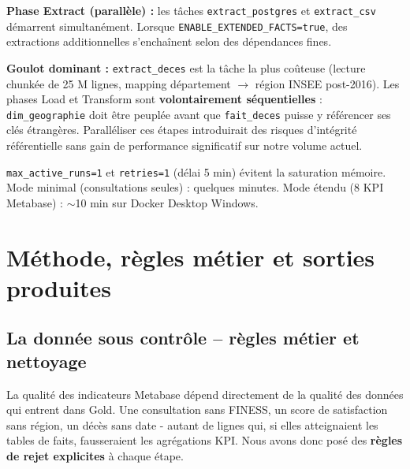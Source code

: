 \documentclass[12pt,a4paper]{report}
\begin{document}
\textbf{Phase Extract (parallèle) :} les tâches \texttt{extract\_postgres} et \texttt{extract\_csv} démarrent simultanément. Lorsque \texttt{ENABLE\_EXTENDED\_FACTS=true}, des extractions additionnelles s'enchaînent selon des dépendances fines.

\textbf{Goulot dominant :} \texttt{extract\_deces} est la tâche la plus coûteuse (lecture chunkée de 25 M lignes, mapping département $\rightarrow$ région INSEE post-2016). Les phases Load et Transform sont \textbf{volontairement séquentielles} : \texttt{dim\_geographie} doit être peuplée avant que \texttt{fait\_deces} puisse y référencer ses clés étrangères. Paralléliser ces étapes introduirait des risques d'intégrité référentielle sans gain de performance significatif sur notre volume actuel.

\begin{successbox}
\texttt{max\_active\_runs=1} et \texttt{retries=1} (délai 5 min) évitent la saturation mémoire. Mode minimal (consultations seules) : quelques minutes. Mode étendu (8 KPI Metabase) : $\sim$10 min sur Docker Desktop Windows.
\end{successbox}

\clearpage
\section{Méthode, règles métier et sorties produites}

\subsection{La donnée sous contrôle -- règles métier et nettoyage}
La qualité des indicateurs Metabase dépend directement de la qualité des données qui entrent dans Gold. Une consultation sans FINESS, un score de satisfaction sans région, un décès sans date - autant de lignes qui, si elles atteignaient les tables de faits, fausseraient les agrégations KPI. Nous avons donc posé des \textbf{règles de rejet explicites} à chaque étape.
\end{document}
